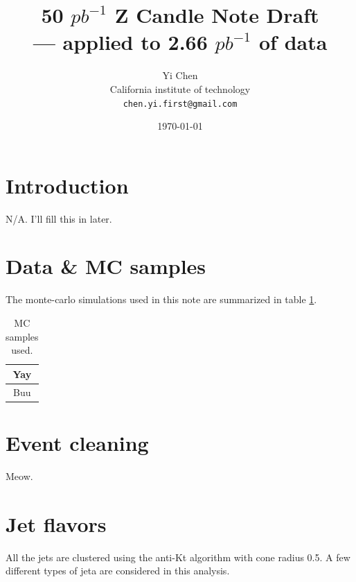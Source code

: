 \documentclass[10pt,a4paper,onecolumn]{article}
\begin{document}
\author{Yi Chen\\
   California institute of technology\\
   \texttt{chen.yi.first@gmail.com}}
\title{50 $pb^{-1}$ Z Candle Note Draft\\ --- applied to 2.66 $pb^{-1}$ of data}
\date{\today}
\maketitle

\tableofcontents
\clearpage

\section{Introduction}

N/A.  I'll fill this in later.

\section{Data \& MC samples}

The monte-carlo simulations used in this note are summarized in table \ref{Table_MCSamples}.

\begin{table}[ht]
   \caption{MC samples used.}
   \centering
   \begin{tabular}{|c|}
   \hline
   Yay \\\hline
   Buu \\\hline
   \end{tabular}
   \label{Table_MCSamples}
\end{table}

\section{Event cleaning}

Meow.

\section{Jet flavors}

All the jets are clustered using the anti-Kt algorithm with cone radius 0.5.  A few different types of jeta are considered in
this analysis.
\end{document}
